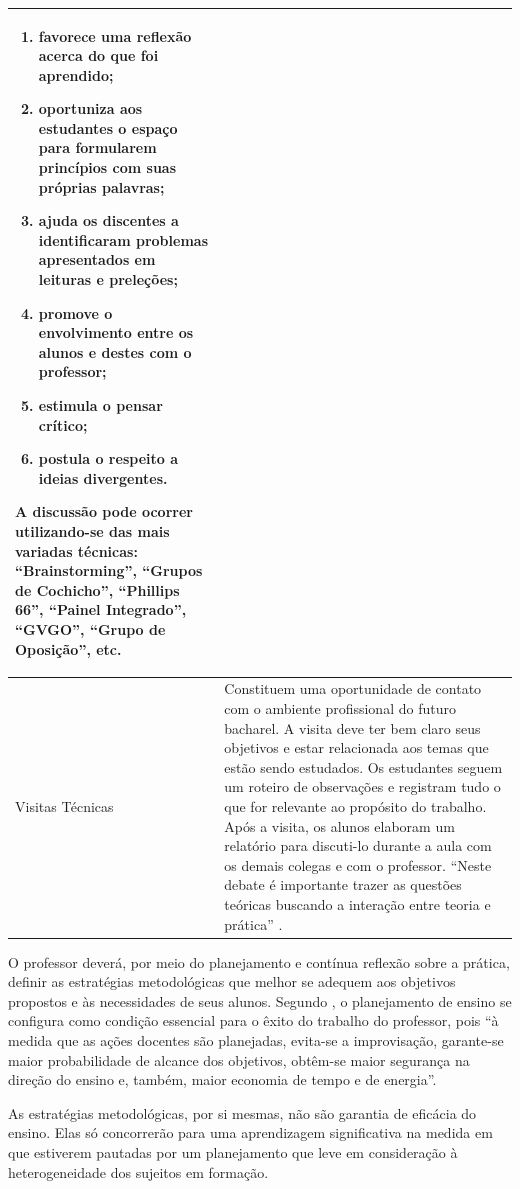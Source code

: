 \documentclass[
	12pt,				%
	openright,			%
  oneside,     %
	a4paper,			%
	chapter=TITLE,		%
	english,			%
	french,				%
	spanish,			%
	brazil				%
	]{abntex2}
\begin{document}
\begin{center}
\begin{scriptsize}
\begin{longtable}{p{4.5cm}p{10cm}}
        \begin{enumerate}[midsep]
            \item favorece uma reflexão acerca do que foi aprendido;
            \item oportuniza aos estudantes o espaço para formularem princípios com suas próprias palavras;
            \item ajuda os discentes a identificaram problemas apresentados em leituras e preleções;
            \item promove o envolvimento entre os alunos e destes com o professor;
            \item estimula o pensar crítico; 	
            \item postula o respeito a ideias divergentes.
        \end{enumerate}

        A discussão pode ocorrer utilizando-se das mais variadas técnicas: “Brainstorming”, “Grupos de Cochicho”, “Phillips 66”, “Painel Integrado”, “GVGO”, “Grupo de Oposição”, etc.\\ \midrule
        Visitas Técnicas & Constituem uma oportunidade de contato com o ambiente profissional do futuro bacharel. A visita deve ter bem claro seus objetivos e estar relacionada aos temas que estão sendo estudados. Os estudantes seguem um roteiro de observações e registram tudo o que for relevante ao propósito do trabalho. Após a visita, os alunos elaboram um relatório para discuti-lo durante a aula com os demais colegas e com o professor. “Neste debate é importante trazer as questões teóricas buscando a interação entre teoria e prática” \cite{masetto2012competencia}.\\
      \bottomrule
\end{longtable}
\end{scriptsize}      
\end{center}

O professor deverá, por meio do planejamento e contínua reflexão sobre a prática, definir as estratégias metodológicas que melhor se adequem aos objetivos propostos e às necessidades de seus alunos. Segundo , o planejamento de ensino se configura como condição essencial para o êxito do trabalho do professor, pois “à medida que as ações docentes são planejadas, evita-se a improvisação, garante-se maior probabilidade de alcance dos objetivos, obtêm-se maior segurança na direção do ensino e, também, maior economia de tempo e de energia”.
	
As estratégias metodológicas, por si mesmas, não são garantia de eficácia do ensino. Elas só concorrerão para uma aprendizagem significativa na medida em que estiverem pautadas por um planejamento que leve em consideração à heterogeneidade dos sujeitos em formação.
\end{document}
